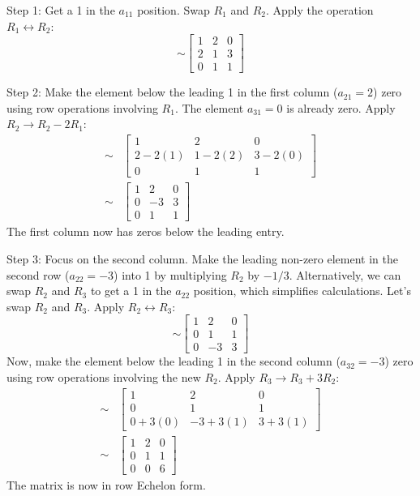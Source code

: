 \documentclass{article}
\begin{document}
Step 1: Get a 1 in the $a_{11}$ position. Swap $R_1$ and $R_2$.
Apply the operation $R_1 \leftrightarrow R_2$:
\[ \sim \begin{bmatrix} 1 & 2 & 0 \\ 2 & 1 & 3 \\ 0 & 1 & 1 \end{bmatrix} \]

Step 2: Make the element below the leading 1 in the first column ($a_{21}=2$) zero using row operations involving $R_1$. The element $a_{31}=0$ is already zero.
Apply $R_2 \to R_2 - 2R_1$:
\begin{align*} \sim &\begin{bmatrix} 1 & 2 & 0 \\ 2 - 2(1) & 1 - 2(2) & 3 - 2(0) \\ 0 & 1 & 1 \end{bmatrix} \\ \sim &\begin{bmatrix} 1 & 2 & 0 \\ 0 & -3 & 3 \\ 0 & 1 & 1 \end{bmatrix}\end{align*}
The first column now has zeros below the leading entry.

Step 3: Focus on the second column. Make the leading non-zero element in the second row ($a_{22}=-3$) into 1 by multiplying $R_2$ by $-1/3$. Alternatively, we can swap $R_2$ and $R_3$ to get a 1 in the $a_{22}$ position, which simplifies calculations. Let's swap $R_2$ and $R_3$.
Apply $R_2 \leftrightarrow R_3$:
\[ \sim \begin{bmatrix} 1 & 2 & 0 \\ 0 & 1 & 1 \\ 0 & -3 & 3 \end{bmatrix} \]
Now, make the element below the leading 1 in the second column ($a_{32}=-3$) zero using row operations involving the new $R_2$.
Apply $R_3 \to R_3 + 3R_2$:
\begin{align*} \sim &\begin{bmatrix} 1 & 2 & 0 \\ 0 & 1 & 1 \\ 0 + 3(0) & -3 + 3(1) & 3 + 3(1) \end{bmatrix} \\ \sim &\begin{bmatrix} 1 & 2 & 0 \\ 0 & 1 & 1 \\ 0 & 0 & 6 \end{bmatrix}\end{align*}
The matrix is now in row Echelon form.
\end{document}
